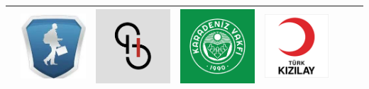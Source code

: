 \documentclass[10pt,a4paper]{altacv}
\begin{document}
\begin{center}
{\begin{tabular}{ |c c c c c|c c c| }
 &{\href{http://ogrencikariyeri.com/index.html}{\includegraphics[scale=0.16]{ok.jpeg}}}
 &{\href{https://startuphukuku.com}{\includegraphics[scale=0.15]{sh.png}}}
 &{\href{http://www.karadenizvakfi.org}{\includegraphics[scale=0.15]{karvak.png}}}
 &{\href{https://www.kizilay.org.tr/Home/Index}{\includegraphics[scale=0.17]{kizilay.png}}}&\\
 \hline
\end{tabular}
}
\end{center}

\clearpage









\clearpage
\end{document}
